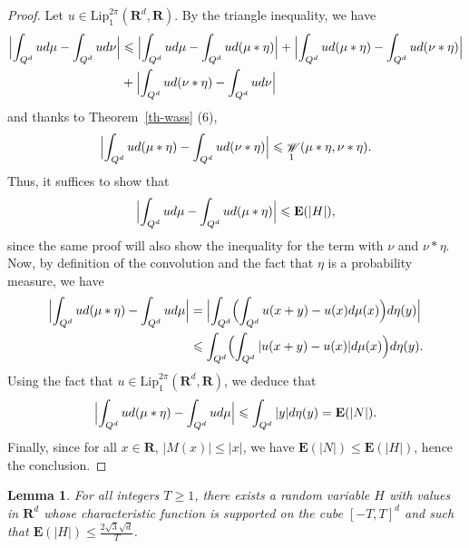 \documentclass[12pt]{amsart}
\renewcommand{\mathcal}{\mathscr}
\newcommand{\Rr}{\mathbf{R}}
\newcommand{\expect}{\mathbf{E}}
\DeclareMathOperator{\wass}{\mathcal{W}}
\theoremstyle{plain}
\newtheorem{lemma}[theorem]{Lemma}
\theoremstyle{remark}
\theoremstyle{definition}
\begin{document}
\begin{proof}
  Let $u \in \mathrm{Lip}^{2\pi}_1(\Rr^d, \Rr)$. By the triangle
  inequality, we have
  \begin{align*}
    \Bigl| \int_{Q^d} u d\mu- \int_{Q^d} u d \nu\Bigr|  &\leqslant 	\Bigl| \int_{Q^d} u d\mu- \int_{Q^d} u d( \mu * \eta) \Bigr| + 	\Bigl| \int_{Q^d} u d(\mu * \eta)- \int_{Q^d} u d( \nu * \eta) \Bigr| \\ &  + 	\Bigl| \int_{Q^d} u d(\nu * \eta)- \int_{Q^d} u d \nu\Bigr|
  \end{align*}
  and thanks to Theorem~\ref{th-wass} (6), 
  $$
  \Bigl| \int_{Q^d} u d(\mu * \eta)- \int_{Q^d} u d( \nu * \eta) \Bigr| \leqslant 	\wass_1(\mu* \eta, \nu * \eta).
  $$
  Thus, it suffices to show that 
  $$
  \Bigl| \int_{Q^d} u d\mu- \int_{Q^d} u d( \mu * \eta) \Bigr| \leqslant \expect(|H|),
  $$
  since the same proof will also show the inequality for the term with
  $\nu$ and $\nu * \eta$. Now, by definition of the convolution and
  the fact that $\eta$ is a probability measure, we have
  \begin{align*}
    \Bigl| \int_{Q^d} u d (\mu * \eta) - \int_{Q^d} u d \mu\Bigr|
    & = \Bigl| \int_{Q^d} \Bigl( \int_{Q^d} u(x+y) - u(x) d \mu(x) \Bigr) d \eta(y) \Bigr| \\
    & \leqslant   \int_{Q^d} \Bigl( \int_{Q^d} |u(x+y) - u(x)| d \mu(x) \Bigr) d \eta(y).
  \end{align*}
  Using the fact that $u \in \mathrm{Lip}^{2\pi}_1(\Rr^d, \Rr)$, we
  deduce that
  $$
  \Bigl| \int_{Q^d} u d (\mu * \eta) - \int_{Q^d} u d \mu\Bigr| \leqslant \int_{Q^d} |y| d \eta(y) = \expect(|N|).
  $$
  Finally, since for all $x \in \Rr$, $|M(x)| \leqslant |x|$, we have $\expect(|N |) \leqslant \expect(|H|)$, hence the conclusion.
\end{proof}

\begin{lemma}\label{lem: choice of H}
  For all integers $T \geqslant 1$, there exists a random variable $H$
  with values in $\Rr^d$ whose characteristic function is supported on
  the cube $[-T,T]^d$ and such that
  $\expect(|H|) \leqslant \frac{2 \sqrt{3}\sqrt{d}}{T}$.
\end{lemma}
\end{document}
